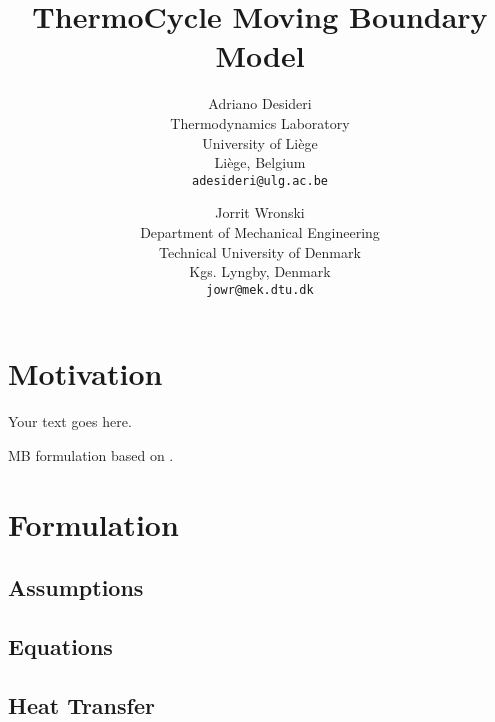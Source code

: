\documentclass[11pt]{article} %
\title{ThermoCycle Moving Boundary Model}
\author{Adriano Desideri\\
\small Thermodynamics Laboratory\\[-0.8ex]
\small University of Li\`ege\\[-0.8ex]
\small Li\`ege, Belgium\\
\small \texttt{adesideri@ulg.ac.be}\\
\and
Jorrit Wronski\\
\small Department of Mechanical Engineering\\[-0.8ex]
\small Technical University of Denmark\\[-0.8ex]
\small Kgs. Lyngby, Denmark\\
\small \texttt{jowr@mek.dtu.dk}
}
\begin{document}

\maketitle



\section{Motivation}


Your text goes here.

\Gls{MB} formulation based on \cite{Bendapudi2008}. 

\section{Formulation}
\subsection{Assumptions}

\subsection{Equations}

\subsection{Heat Transfer}
\end{document}
